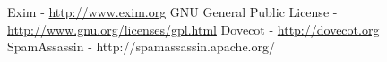\begin{thebibliography}{9}
    Exim - \url{http://www.exim.org}
    GNU General Public License - \url{http://www.gnu.org/licenses/gpl.html}
    Dovecot - \url{http://dovecot.org}
	SpamAssassin - http://spamassassin.apache.org/
\end{thebibliography}



